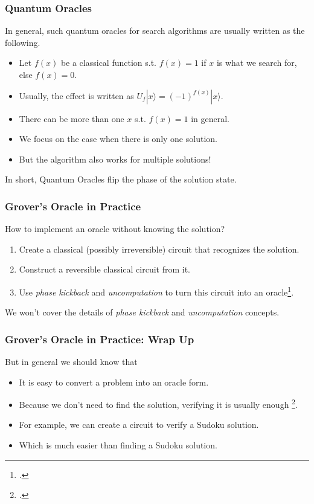\documentclass{beamer}
\begin{document}
\begin{frame}
  \frametitle{Quantum Oracles}
  In general, such quantum oracles for search algorithms are usually written as the following.
  \begin{itemize}
    \item Let $f(x)$ be a classical function s.t. $f(x)=1$ if $x$ is what we search for, else $f(x)=0$.
    \item Usually, the effect is written as $U_f|x\rangle = (-1)^{f(x)}|x\rangle$.
    \item There can be more than one $x$ s.t. $f(x)=1$ in general.
    \item We focus on the case when there is only one solution.
    \item But the algorithm also works for multiple solutions!  
  \end{itemize}
  In short, Quantum Oracles flip the phase of the solution state.
\end{frame}

\begin{frame}
  \frametitle{Grover's Oracle in Practice}
  How to implement an oracle without knowing the solution?
  \begin{enumerate}
    \item Create a classical (possibly irreversible) circuit that recognizes the solution.
    \item Construct a reversible classical circuit from it.
    \item Use \textit{phase kickback} and \textit{uncomputation} to turn this circuit into an oracle\footcite[]{book}.
  \end{enumerate}
  We won't cover the details of \textit{phase kickback} and \textit{uncomputation} concepts. 

\end{frame}

\begin{frame}
  \frametitle{Grover's Oracle in Practice: Wrap Up}

But in general we should know that 
\begin{itemize}
  \item It is easy to convert a problem into an oracle form.
  \item Because we don't need to find the solution, verifying it is usually enough \footcite[]{Qiskit}.
  \item For example, we can create a circuit to verify a Sudoku solution.
  \item Which is much easier than finding a Sudoku solution.
\end{itemize}
\end{frame}
\end{document}
